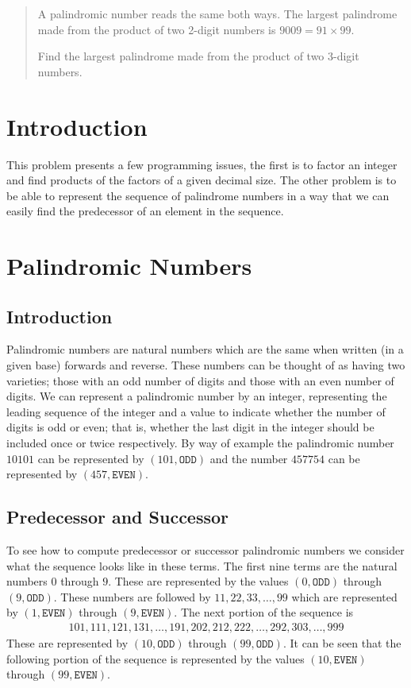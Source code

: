 \documentclass[oneside,12pt]{book}   	%
\newcounter{ex}
\newcounter{pr}
\theoremstyle{definition}
\begin{document}
\begin{spacing}{1.618}
		\begin{quote}
			A palindromic number reads the same both ways. The largest palindrome made from the product of two 2-digit numbers is $9009 = 91\times 99$.

			Find the largest palindrome made from the product of two 3-digit numbers.
		\end{quote}
		
		\section{Introduction}
	
			This problem presents a few programming issues, the first is to factor an integer and find products of the factors of a given decimal size. The other problem is to be able to represent the sequence of palindrome numbers in a way that we can easily find the predecessor of an element in the sequence.
			
		\section{Palindromic Numbers}
		
			\subsection{Introduction}
				Palindromic numbers are natural numbers which are the same when written (in a given base) forwards and reverse. These numbers can be thought of as having two varieties; those with an odd number of digits and those with an even number of digits.  We can represent a palindromic number by an integer, representing the leading sequence of the integer and a value to indicate whether the number of digits is odd or even; that is, whether the last digit in the integer should be included once or twice respectively. By way of example the palindromic number $10101$ can be represented by $(101, \mathtt{ODD})$ and the number $457754$ can be represented by $(457, \mathtt{EVEN})$. 
		
			\subsection{Predecessor and Successor}	
				To see how to compute predecessor or successor palindromic numbers we consider what the sequence looks like in these terms. The first nine terms are the natural numbers $0$ through $9$. These are represented by the values $(0, \mathtt{ODD})$ through $(9, \mathtt{ODD})$. These numbers are followed by $11, 22, 33, \dots, 99$ which are represented by $(1, \mathtt{EVEN})$ through $(9, \mathtt{EVEN})$. The next portion of the sequence is 
				\begin{alignat*}{4}
					101, 111, 121, 131, \dots, 191, 202, 212, 222, \dots, 292, 303, \dots, 999
				\end{alignat*}
				These are represented by $(10, \mathtt{ODD})$ through $(99, \mathtt{ODD})$. It can be seen that the following portion of the sequence is represented by the values $(10, \mathtt{EVEN})$ through $(99, \mathtt{EVEN})$. 
			

\end{spacing}
\end{document}
